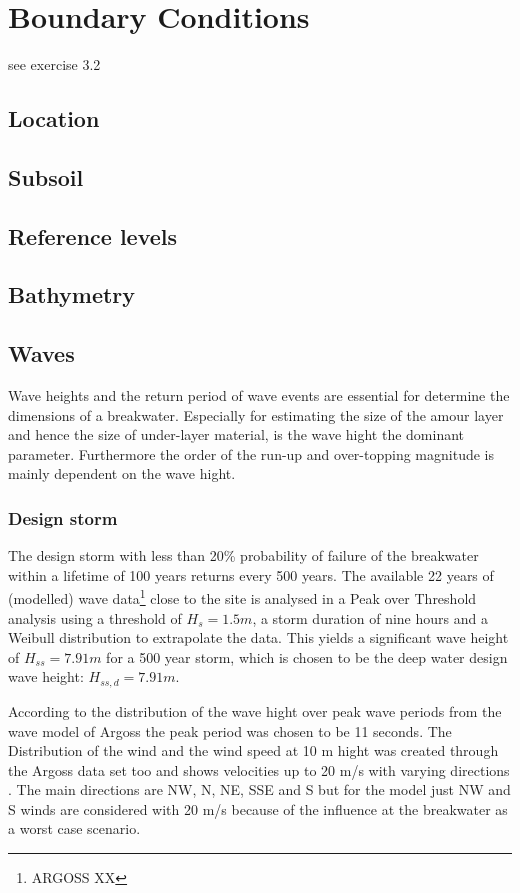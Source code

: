 \chapter{Boundary Conditions}

see exercise 3.2

\section{Location}

\section{Subsoil}

\section{Reference levels}

\section{Bathymetry}

\section{Waves}
Wave heights and the return period of wave events are essential for determine the dimensions of a breakwater. Especially for estimating the size of the amour layer and hence the size of under-layer material, is the wave hight the dominant parameter. Furthermore the order of the run-up and over-topping magnitude is mainly dependent on the wave hight.
\subsection{Design storm}
The design storm with less than 20\% probability of failure of the breakwater within a lifetime of 100 years returns every 500 years.
The available 22 years of (modelled) wave data\footnote{ARGOSS XX} close to the site is analysed in a Peak over Threshold analysis using a threshold of $H_s=1.5m$, a storm duration of nine hours and a Weibull distribution to extrapolate the data.
This yields a significant wave height of $H_{ss}=7.91m$ for a 500 year storm, which is chosen to be the deep water design wave height: $H_{ss,d}=7.91m$.

According to the distribution of the wave hight over peak wave periods from the wave model of Argoss %
the peak period was chosen to be 11 seconds.
The Distribution of the wind and the wind speed at 10 m hight was created through the Argoss data set too and shows velocities up to 20 m/s with varying directions
. The main  directions are NW, N, NE, SSE and S but for the model just NW and S winds are considered with 20 m/s because of the influence at the breakwater as a worst case scenario.

